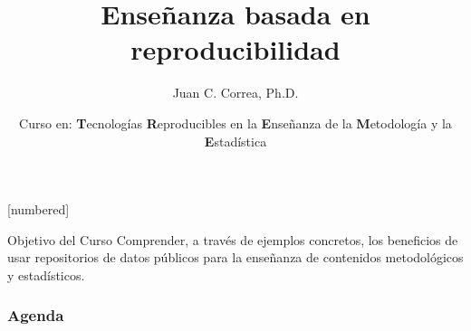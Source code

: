 \documentclass{beamer}
\begin{document}



\author[Juan C. Correa \textcolor{white}{(\url{https://correajc.com}})]{Juan C. Correa, Ph.D.}
\title[Enseñanza basada en reproducibilidad]{Enseñanza basada en reproducibilidad}
[numbered]
\date[Bogotá, Junio-2021]{Curso en: \textbf{T}ecnologías \textbf{R}eproducibles en la \textbf{E}nseñanza de la \textbf{M}etodología y la \textbf{E}stadística}


\begin{frame}
	\titlepage
\end{frame}

\begin{frame}
\begin{block}{Objetivo del Curso}
\vspace{0.3cm}
Comprender, a través de ejemplos concretos, los beneficios de usar repositorios de datos públicos para la enseñanza de contenidos metodológicos y estadísticos.  
\end{block}
\end{frame}



\begin{frame}
\frametitle{Agenda} 
\tableofcontents
\end{frame}
\end{document}

